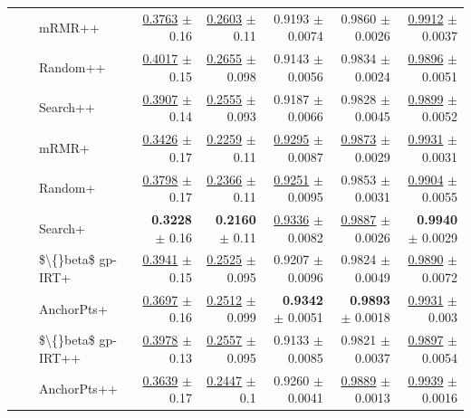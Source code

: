 \begin{longtable}{llp{}rrrrr}
 &  & mRMR++ & \underline{0.3763} {\scriptsize $\pm$ 0.16} & \underline{0.2603} {\scriptsize $\pm$ 0.11} & 0.9193 {\scriptsize $\pm$ 0.0074} & 0.9860 {\scriptsize $\pm$ 0.0026} & \underline{0.9912} {\scriptsize $\pm$ 0.0037} \\
 &  & Random++ & \underline{0.4017} {\scriptsize $\pm$ 0.15} & \underline{0.2655} {\scriptsize $\pm$ 0.098} & 0.9143 {\scriptsize $\pm$ 0.0056} & 0.9834 {\scriptsize $\pm$ 0.0024} & \underline{0.9896} {\scriptsize $\pm$ 0.0051} \\
 &  & Search++ & \underline{0.3907} {\scriptsize $\pm$ 0.14} & \underline{0.2555} {\scriptsize $\pm$ 0.093} & 0.9187 {\scriptsize $\pm$ 0.0066} & 0.9828 {\scriptsize $\pm$ 0.0045} & \underline{0.9899} {\scriptsize $\pm$ 0.0052} \\
 &  & mRMR+ & \underline{0.3426} {\scriptsize $\pm$ 0.17} & \underline{0.2259} {\scriptsize $\pm$ 0.11} & \underline{0.9295} {\scriptsize $\pm$ 0.0087} & \underline{0.9873} {\scriptsize $\pm$ 0.0029} & \underline{0.9931} {\scriptsize $\pm$ 0.0031} \\
 &  & Random+ & \underline{0.3798} {\scriptsize $\pm$ 0.17} & \underline{0.2366} {\scriptsize $\pm$ 0.11} & \underline{0.9251} {\scriptsize $\pm$ 0.0095} & 0.9853 {\scriptsize $\pm$ 0.0031} & \underline{0.9904} {\scriptsize $\pm$ 0.0055} \\
 &  & Search+ & \textbf{0.3228} {\scriptsize $\pm$ 0.16} & \textbf{0.2160} {\scriptsize $\pm$ 0.11} & \underline{0.9336} {\scriptsize $\pm$ 0.0082} & \underline{0.9887} {\scriptsize $\pm$ 0.0026} & \textbf{0.9940} {\scriptsize $\pm$ 0.0029} \\
 &  & \$\textbackslash\{\}beta\$ gp-IRT+ & \underline{0.3941} {\scriptsize $\pm$ 0.15} & \underline{0.2525} {\scriptsize $\pm$ 0.095} & 0.9207 {\scriptsize $\pm$ 0.0096} & 0.9824 {\scriptsize $\pm$ 0.0049} & \underline{0.9890} {\scriptsize $\pm$ 0.0072} \\
 &  & AnchorPts+ & \underline{0.3697} {\scriptsize $\pm$ 0.16} & \underline{0.2512} {\scriptsize $\pm$ 0.099} & \textbf{0.9342} {\scriptsize $\pm$ 0.0051} & \textbf{0.9893} {\scriptsize $\pm$ 0.0018} & \underline{0.9931} {\scriptsize $\pm$ 0.003} \\
 &  & \$\textbackslash\{\}beta\$ gp-IRT++ & \underline{0.3978} {\scriptsize $\pm$ 0.13} & \underline{0.2557} {\scriptsize $\pm$ 0.095} & 0.9133 {\scriptsize $\pm$ 0.0085} & 0.9821 {\scriptsize $\pm$ 0.0037} & \underline{0.9897} {\scriptsize $\pm$ 0.0054} \\
 &  & AnchorPts++ & \underline{0.3639} {\scriptsize $\pm$ 0.17} & \underline{0.2447} {\scriptsize $\pm$ 0.1} & 0.9260 {\scriptsize $\pm$ 0.0041} & \underline{0.9889} {\scriptsize $\pm$ 0.0013} & \underline{0.9939} {\scriptsize $\pm$ 0.0016} \\

\end{longtable}
